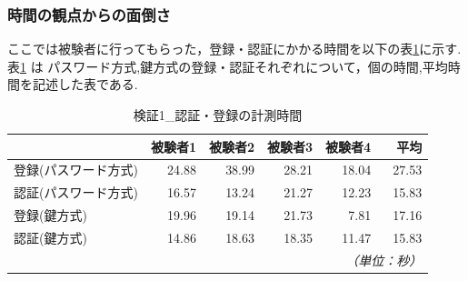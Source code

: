     \subsubsection{時間の観点からの面倒さ}
        ここでは被験者に行ってもらった，登録・認証にかかる時間を以下の表\ref{検証１ 認証・登録の計測時間}に示す.
        表\ref{検証１ 認証・登録の計測時間} は パスワード方式,鍵方式の登録・認証それぞれについて，個の時間,平均時間を記述した表である.
        \begin{table}[htb]
            \caption{検証1\_認証・登録の計測時間}
            \label{検証１ 認証・登録の計測時間}
            \begin{tabular}{|l|r|r|r|r|r|} \hline%
                                & 被験者1 & 被験者2 & 被験者3  & 被験者4 &　平均 \\ \hline%
                登録(パスワード方式) & 24.88 & 38.99 & 28.21 & 18.04 & 27.53 \\ \hline
                認証(パスワード方式) & 16.57 & 13.24 & 21.27 & 12.23 & 15.83 \\ \hline
                登録(鍵方式)       & 19.96 & 19.14 & 21.73 & 7.81 & 17.16 \\ \hline
                認証(鍵方式)       & 14.86 & 18.63 & 18.35 & 11.47 & 15.83 \\ \hline

                \multicolumn{6}{r}{\small\it （単位：秒）}\\
                \end{tabular}
        \end{table}



